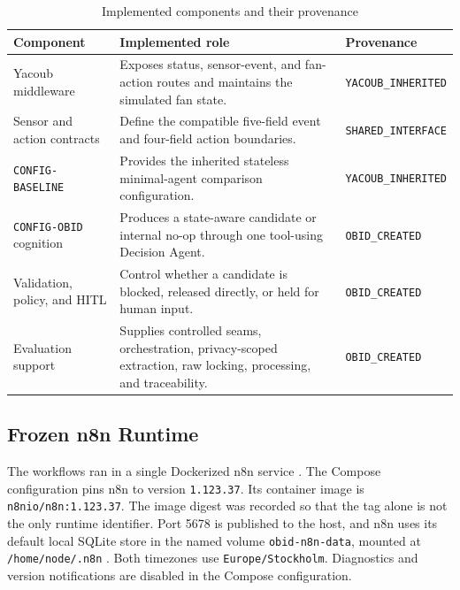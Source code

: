 \begin{table}[H]
\centering
\caption{Implemented components and their provenance}
\label{tab:impl-components}
\small
\begin{tabularx}{\textwidth}{L{0.23\textwidth}Y L{0.23\textwidth}}
\toprule
\textbf{Component} & \textbf{Implemented role} & \textbf{Provenance} \\
\midrule
Yacoub middleware & Exposes status, sensor-event, and fan-action routes and
maintains the simulated fan state. & {\footnotesize\texttt{YACOUB\_INHERITED}} \\
Sensor and action contracts & Define the compatible five-field event and
four-field action boundaries. & {\footnotesize\texttt{SHARED\_INTERFACE}} \\
\texttt{CONFIG-BASELINE} & Provides the inherited stateless minimal-agent
comparison configuration. & {\footnotesize\texttt{YACOUB\_INHERITED}} \\
\texttt{CONFIG-OBID} cognition & Produces a state-aware candidate or internal
no-op through one tool-using Decision Agent. & {\footnotesize\texttt{OBID\_CREATED}} \\
Validation, policy, and HITL & Control whether a candidate is blocked,
released directly, or held for human input. & {\footnotesize\texttt{OBID\_CREATED}} \\
Evaluation support & Supplies controlled seams, orchestration, privacy-scoped
extraction, raw locking, processing, and traceability. &
{\footnotesize\texttt{OBID\_CREATED}} \\
\bottomrule
\end{tabularx}
\end{table}

\subsection{Frozen n8n Runtime}\label{subsec:impl-runtime}

The workflows ran in a single Dockerized n8n service
\cite{n8nCreateRunWorkflows}. The Compose
configuration pins n8n to version \texttt{1.123.37}. Its container image is
\texttt{n8nio/n8n:1.123.37}. The image digest was recorded so that the tag
alone is not the only runtime identifier. Port 5678 is published to the host,
and n8n uses its default local SQLite store in the named volume
\texttt{obid-n8n-data}, mounted at \texttt{/home/node/.n8n}
\cite{n8nDocker}. Both timezones use
\texttt{Europe/Stockholm}. Diagnostics and version notifications are disabled
in the Compose configuration.

